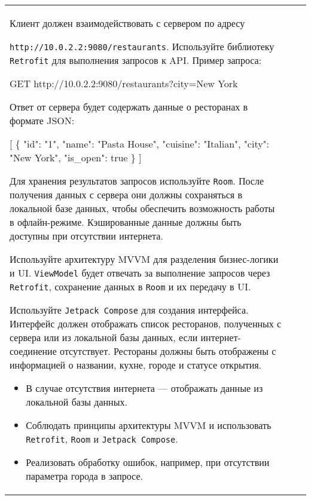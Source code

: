 \documentclass[a4paper]{article}
\begin{document}
\begin{tabular}{!{\vrule width 2pt}p{5cm}|p{6cm}|p{4cm}!{\vrule width 2pt}}
{\begin{minipage}{16cm}
\begin{enumerate}
Клиент должен взаимодействовать с сервером по адресу 

\texttt{http://10.0.2.2:9080/restaurants}. Используйте библиотеку \texttt{Retrofit} для выполнения запросов к API. Пример запроса:


GET http://10.0.2.2:9080/restaurants?city=New York


Ответ от сервера будет содержать данные о ресторанах в формате JSON:


[
  \{
    "id": "1",
    "name": "Pasta House",
    "cuisine": "Italian",
    "city": "New York",
    "is\_open": true
  \}
]


Для хранения результатов запросов используйте \texttt{Room}. После получения данных с сервера они должны сохраняться в локальной базе данных, чтобы обеспечить возможность работы в офлайн-режиме. Кэшированные данные должны быть доступны при отсутствии интернета.

Используйте архитектуру MVVM для разделения бизнес-логики и UI. \texttt{ViewModel} будет отвечать за выполнение запросов через \texttt{Retrofit}, сохранение данных в \texttt{Room} и их передачу в UI.

Используйте \texttt{Jetpack Compose} для создания интерфейса. Интерфейс должен отображать список ресторанов, полученных с сервера или из локальной базы данных, если интернет-соединение отсутствует. Рестораны должны быть отображены с информацией о названии, кухне, городе и статусе открытия.

\begin{itemize}
  \item В случае отсутствия интернета — отображать данные из локальной базы данных.
  \item Соблюдать принципы архитектуры MVVM и использовать \texttt{Retrofit}, \texttt{Room} и \texttt{Jetpack Compose}.
  \item Реализовать обработку ошибок, например, при отсутствии параметра города в запросе.
\end{itemize} 
\end{enumerate}


\end{minipage}}
\end{tabular}
\end{document}
